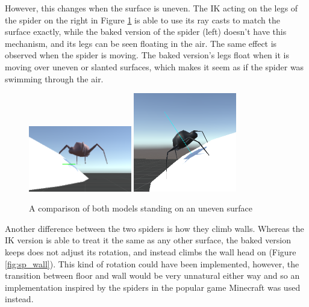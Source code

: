 However, this changes when the surface is uneven. The IK acting on
the legs of the spider on the right in Figure \ref{fig:sp_round} is able to use
its ray casts to match the surface exactly, while the baked version of the
spider (left) doesn't have this mechanism, and its legs can be seen floating in
the air. The same effect is observed when the spider is moving. The baked
version's legs float when it is moving over uneven or slanted surfaces, which
makes it seem as if the spider was swimming through the air. 

\begin{figure}[h!]
    \centering
    \captionsetup{justification=centering}
    \includegraphics[width=0.4\textwidth]{grafika/sp_b_round.png}
    \includegraphics[width=0.4\textwidth]{grafika/sp_ik_round.png}
    \caption{A comparison of both models standing on an uneven surface}
    \label{fig:sp_round}
\end{figure}

Another difference between the two spiders is how they climb walls. Whereas the
IK version is able to treat it the same as any other surface, the baked version
keeps does not adjust its rotation, and instead climbs the wall head on (Figure
\ref{fig:sp_wall}). This kind of rotation could have been implemented, however,
the transition between floor and wall would be very unnatural either way and so
an implementation inspired by the spiders in the popular game Minecraft was used
instead.

